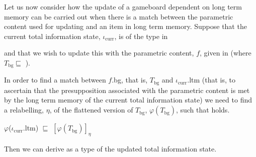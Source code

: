 Let us now consider how the update of a gameboard dependent on long
term memory can be carried out when there is a match between the
parametric content used for updating and an item in long term memory.
Suppose that the current total information state, $\iota_{\mathrm{curr}}$, is of the type in \nexteg{}
\begin{ex} 
\end{ex} 
and that we wish to update this with the parametric content, $f$, given in \nexteg{} (where
$T_{\mathrm{bg}}\sqsubseteq$ ).
\begin{ex}
\end{ex} 
In order to find a match between $f$.bg, that is, $T_{\mathrm{bg}}$ and $\iota_{\mathrm{curr}}$.ltm
(that is, to ascertain that the presupposition associated with the
parametric content is met by the long term memory of the current total
information state) we need to find a relabelling, $\eta$, of the flattened
version of $T_{\mathrm{bg}}$, $\varphi(T_{\mathrm{bg}})$, such that
\nexteg{} holds.
\begin{ex} 
$\varphi$($\iota_{\mathrm{curr}}$.ltm) $\sqsubseteq$ $[\varphi(T_{\mathrm{bg}})]_\eta$ 
\end{ex} 
Then we can derive \nexteg{} as a type of the updated total
information state.
\begin{ex} 

 
\end{ex}
